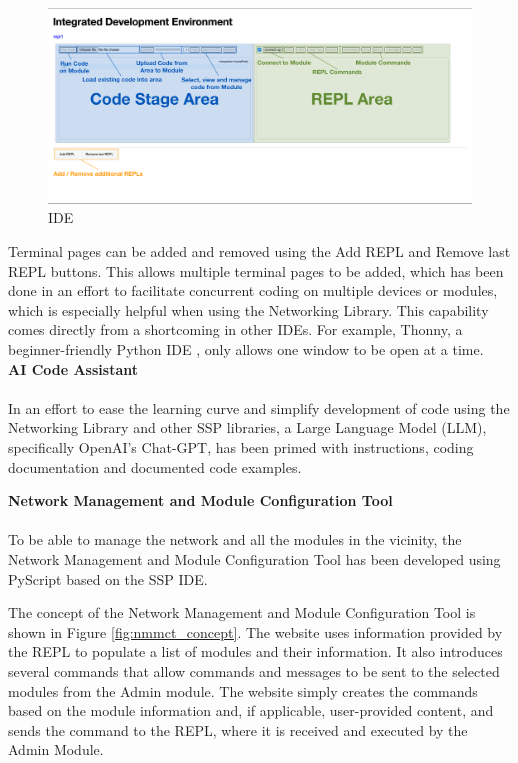 \begin{figure}[H]
    \centering
    \includegraphics[width=\linewidth]{overleaf/images/ide.png}
    \vspace{\ftspace}
    \caption{IDE}
    \vspace{\ftspace}
    \label{fig:ide}
\end{figure}

Terminal pages can be added and removed using the Add REPL and Remove last REPL buttons. This allows multiple terminal pages to be added, which has been done in an effort to facilitate concurrent coding on multiple devices or modules, which is especially helpful when using the Networking Library. This capability comes directly from a shortcoming in other IDEs. For example, Thonny, a beginner-friendly Python IDE \citep{annamaa_thonny_2015, aivar_annamaa_thonny_2025,aivar_annamaa_thonny_nodate, annamaa_introducing_2015}, only allows one window to be open at a time.\\

\textbf{\label{sec:methods_configai}AI Code Assistant}\\\\
In an effort to ease the learning curve and simplify development of code using the Networking Library and other SSP libraries, a Large Language Model (LLM), specifically  OpenAI's Chat-GPT, has been primed with instructions, coding documentation and documented code examples.

\textbf{\label{sec:methods_nmt}Network Management and Module Configuration Tool}\\\\
To be able to manage the network and all the modules in the vicinity, the Network Management and Module Configuration Tool has been developed using PyScript based on the SSP IDE.

The concept of the Network Management and Module Configuration Tool is shown in Figure \ref{fig:nmmct_concept}. The website uses information provided by the REPL to populate a list of modules and their information. It also introduces several commands that allow commands and messages to be sent to the selected modules from the Admin module. The website simply creates the commands based on the module information and, if applicable, user-provided content, and sends the command to the REPL, where it is received and executed by the Admin Module.

